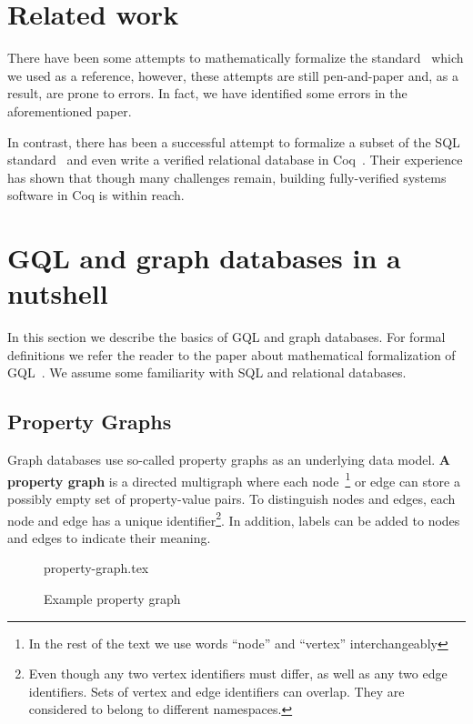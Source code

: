 \documentclass[14pt]{constructor-thesis}
\theoremstyle{definition}
\begin{document}
\section{Related work}

There have been some attempts to mathematically formalize the standard~\cite{GQL-formalized-on-paper} which we used as a reference, however, these attempts are still pen-and-paper and, as a result, are prone to errors. In fact, we have identified some errors in the aforementioned paper.

In contrast, there has been a successful attempt to formalize a subset of the SQL standard~\cite{sql-in-coq} and even write a verified relational database in Coq~\cite{rdbms-in-coq}. Their experience has shown that though many challenges remain, building fully-verified systems software in Coq is within reach.

\section{GQL and graph databases in a nutshell}

In this section we describe the basics of GQL and graph databases. For formal definitions we refer the reader to the paper about mathematical formalization of GQL~\cite{GQL-formalized-on-paper}. We assume some familiarity with SQL and relational databases.

\subsection{Property Graphs}

Graph databases use so-called property graphs as an underlying data model. \textbf{A property graph} is a directed multigraph where each node~\footnote{In the rest of the text we use words ``node'' and ``vertex'' interchangeably} or edge can store a possibly empty set of property-value pairs. To distinguish nodes and edges, each node and edge has a unique identifier\footnote{Even though any two vertex identifiers must differ, as well as any two edge identifiers. Sets of vertex and edge identifiers can overlap. They are considered to belong to different namespaces.}. In addition, labels can be added to nodes and edges to indicate their meaning.

\begin{figure}[b]
  \centering
  
  {property-graph.tex}

  \caption{Example property graph}
  \label{fig:property-graph}
\end{figure}
\end{document}
